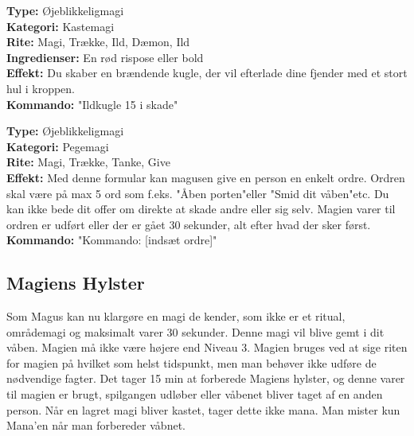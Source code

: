 \begin{lærmagi*}[Ildkugle]
\textbf{Type:} Øjeblikkeligmagi\\
\textbf{Kategori:} Kastemagi\\
\textbf{Rite:} Magi, Trække, Ild, Dæmon, Ild\\
\textbf{Ingredienser:} En rød rispose eller bold\\
\textbf{Effekt:} Du skaber en brændende kugle, der vil efterlade dine fjender med et stort hul i kroppen.\\
\textbf{Kommando:} "Ildkugle 15 i skade"\\
\end{lærmagi*}

\begin{lærmagi*}[Kommando]
\textbf{Type:} Øjeblikkeligmagi\\
\textbf{Kategori:} Pegemagi\\
\textbf{Rite:} Magi, Trække, Tanke, Give\\
\textbf{Effekt:} Med denne formular kan magusen give en person en enkelt ordre. Ordren skal være på max 5 ord som f.eks. "Åben porten"eller "Smid dit våben"etc. Du kan ikke bede dit offer om direkte at skade andre eller sig selv. Magien varer til ordren er udført eller der er gået 30 sekunder, alt efter hvad der sker først.\\
\textbf{Kommando:} "Kommando: [indsæt ordre]"\\
\end{lærmagi*}

\subsection{Magiens Hylster}
Som Magus kan nu klargøre en magi de kender, som ikke er et ritual, områdemagi og maksimalt varer 30 sekunder. Denne magi vil blive gemt i dit våben. Magien må ikke være højere end Niveau 3. Magien bruges ved at sige riten for magien på hvilket som helst tidspunkt, men man behøver ikke udføre de nødvendige fagter. Det tager 15 min at forberede Magiens hylster, og denne varer til magien er brugt, spilgangen udløber eller våbenet bliver taget af en anden person. Når en lagret magi bliver kastet, tager dette ikke mana. Man mister kun Mana'en når man forbereder våbnet.


